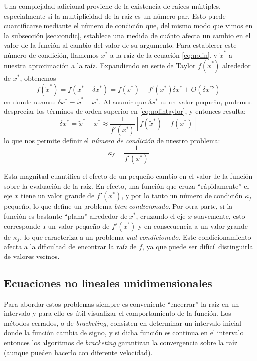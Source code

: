 Una complejidad adicional proviene de la existencia de raíces múltiples, especialmente si la multiplicidad de la raíz es un número par. Esto puede cuantificarse mediante el número de condición que, del mismo modo que vimos en la subsección \ref{sec:condic}, establece una medida de cuánto afecta un cambio en el valor de la función al cambio del valor de su argumento. Para establecer este número de condición, llamemos $x^*$ a la raíz de la ecuación \eqref{eq:nolin}, y $\tilde{x}^*$ a nuestra aproximación a la raíz. Expandiendo en serie de Taylor  $f(\tilde{x}^*)$ alrededor de $x^*$, obtenemos
\begin{equation}\label{eq:nolintaylor}
 f(\tilde{x}^*) = f(x^* + \delta x^*) = f(x^*) + f'(x^*) \delta x^* + O \left(\delta x^{*2} \right)
\end{equation} 
en donde usamos $\delta x^* = \tilde{x}^* - x^*$. Al asumir que $\delta x^*$ es un valor pequeño, podemos despreciar los términos de orden superior en \eqref{eq:nolintaylor}, y entonces resulta:
\begin{equation}
 \delta x^* = \tilde{x}^* - x^* \approx \frac{1}{f'(x^*)} \left[ f(\tilde{x}^*) - f(x^*) \right]
\end{equation} 
lo que nos permite definir el \textit{número de condición} de nuestro problema:
\begin{equation}\label{eq:sisnolincond}
 \kappa_f = \frac{1}{f'(x^*)}
\end{equation} 

Esta magnitud cuantifica el efecto de un pequeño cambio en el valor de la función sobre la evaluación de la raíz. En efecto, una función que cruza ``rápidamente'' el eje $x$ tiene un valor grande de $f'(x^*)$, y por lo tanto un número de condición $\kappa_f$ pequeño, lo que define un problema \textit{bien condicionado}. Por otra parte, si la función es bastante ``plana'' alrededor de $x^*$, cruzando el eje $x$ suavemente, esto corresponde a un valor pequeño de $f'(x^*)$ y en consecuencia a un valor grande de $\kappa_f$, lo que caracteriza a un problema \textit{mal condicionado}. Este condicionamiento afecta a la dificultad de encontrar la raíz de $f$, ya que puede ser difícil distinguirla de valores vecinos. 

\subsection{Ecuaciones no lineales unidimensionales} \label{sec:nolinunidimensional}
Para abordar estos problemas siempre es conveniente ``encerrar'' la raíz en un intervalo y para ello es útil visualizar el comportamiento de la función. Los métodos cerrados, o de \textit{bracketing}, consisten en determinar un intervalo inicial donde la función cambia de signo, y si dicha función es continua en el intervalo entonces los algoritmos de \textit{bracketing} garantizan la convergencia sobre la raíz (aunque pueden hacerlo con diferente velocidad). 

